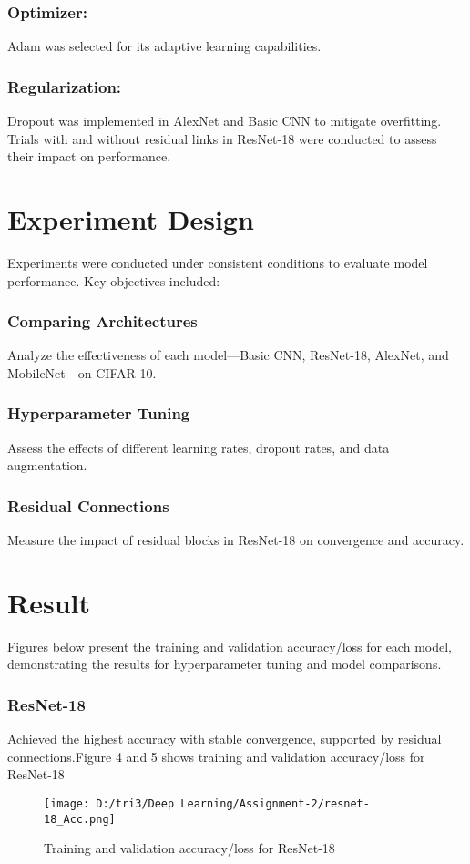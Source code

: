 \documentclass[10pt,twocolumn,letterpaper]{article}
\begin{document}
\subsubsection{Optimizer:}Adam was selected for its adaptive learning capabilities.
\subsubsection{Regularization:} Dropout was implemented in AlexNet and Basic CNN to mitigate overfitting. Trials with and without residual links in ResNet-18 were conducted to assess their impact on performance.
\section{Experiment Design}
Experiments were conducted under consistent conditions to evaluate model performance. Key objectives included:

\subsubsection{Comparing Architectures}  Analyze the effectiveness of each model—Basic CNN, ResNet-18, AlexNet, and MobileNet—on CIFAR-10.
\subsubsection{Hyperparameter Tuning} Assess the effects of different learning rates, dropout rates, and data augmentation.
\subsubsection{Residual Connections}Measure the impact of residual blocks in ResNet-18 on convergence and accuracy.
\section{Result}
Figures below present the training and validation accuracy/loss for each model, demonstrating the results for hyperparameter tuning and model comparisons.

\subsubsection{ResNet-18} Achieved the highest accuracy with stable convergence, supported by residual connections.Figure 4 and 5 shows training and validation accuracy/loss for ResNet-18

\begin{figure}[H]
    \centering
    \texttt{[image: D:/tri3/Deep Learning/Assignment-2/resnet-18\_Acc.png]}
    \caption{Training and validation accuracy/loss for ResNet-18}
    \label{fig1: Implementation of AlexNet}
\end{figure}
\end{document}
